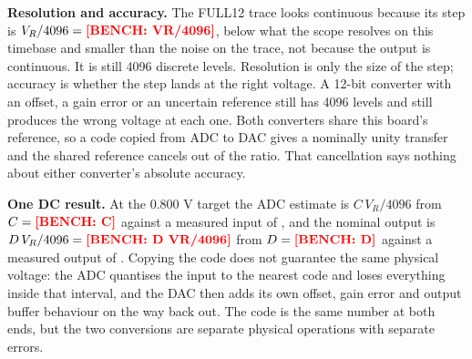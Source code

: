 \documentclass[11pt,a4paper]{article}
\begin{document}
\textbf{Resolution and accuracy.} The FULL12 trace looks continuous because its step
is $V_R/4096 = \textcolor{red}{\textbf{[BENCH: VR/4096]}}$, below what the scope resolves on this timebase and smaller
than the noise on the trace, not because the output is continuous. It is still 4096
discrete levels. Resolution is only the size of the step; accuracy is whether the
step lands at the right voltage. A 12-bit converter with an offset, a gain error or
an uncertain reference still has 4096 levels and still produces the wrong voltage at
each one. Both converters share this board's reference, so a code copied from ADC to
DAC gives a nominally unity transfer and the shared reference cancels out of the
ratio. That cancellation says nothing about either converter's absolute accuracy.

\textbf{One DC result.} At the 0.800 V target the ADC estimate is
$C\,V_R/4096$ from $C = \textcolor{red}{\textbf{[BENCH: C]}}$ against a measured input of \mLoFullIn, and the
nominal output is $D\,V_R/4096 = \textcolor{red}{\textbf{[BENCH: D VR/4096]}}$ from $D = \textcolor{red}{\textbf{[BENCH: D]}}$ against a
measured output of \mLoFullOut. Copying the code does not guarantee the same
physical voltage: the ADC quantises the input to the nearest code and loses
everything inside that interval, and the DAC then adds its own offset, gain error
and output buffer behaviour on the way back out. The code is the same number at both
ends, but the two conversions are separate physical operations with separate errors.
\end{document}
